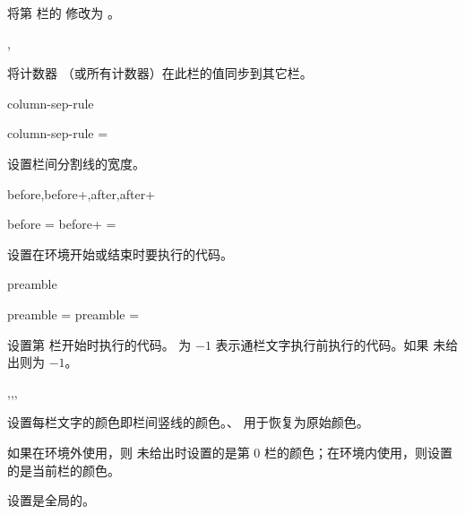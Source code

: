\documentclass[twoside]{book}
\begin{document}
\begin{function}[module=paracol]{}
  \begin{syntax}
    \V{} {}  
  \end{syntax}
  将第  栏的  修改为 。
\end{function}

\begin{function}[module=paracol]{\synccounter,\syncallcounter}
  \begin{syntax}
    \V\synccounter {}
    \V\syncallcounter 
  \end{syntax}
  将计数器  （或所有计数器）在此栏的值同步到其它栏。
\end{function}

\begin{keyval}[path=paracol]{column-sep-rule}
  \begin{syntax}
    column-sep-rule = 
  \end{syntax}
  设置栏间分割线的宽度。
\end{keyval}

\begin{keyval}[path=paracol]{before,before+,after,after+}
  \begin{syntax}
    before  = 
    before+ = 
  \end{syntax}
  设置在环境开始或结束时要执行的代码。
\end{keyval}

\begin{keyval}[path=paracol]{preamble}
  \begin{syntax}
    preamble       \;= 
    preamble  = 
  \end{syntax}
设置第  栏开始时执行的代码。 为 $-1$ 表示通栏文字执行前执行的代码。如果  未给出则为 $-1$。
\end{keyval}

\begin{function}[module=paracol]{\columncolor,\normalcolumncolor,\colseprulecolor,\normalcolseprulecolor}
  \begin{syntax}
    \V\columncolor {}  
    \V\normalcolumncolor {}
    \V\colseprulecolor {}  
    \V\normalcolseprulecolor {}
  \end{syntax}
  设置每栏文字的颜色即栏间竖线的颜色。、 用于恢复为原始颜色。

  如果在环境外使用，则  未给出时设置的是第 0 栏的颜色；在环境内使用，则设置的是当前栏的颜色。

  设置是全局的。
\end{function}
\end{document}

